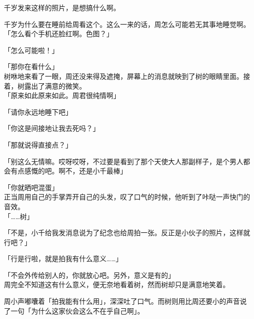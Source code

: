 千岁发来这样的照片，是想搞什么啊。

千岁为什么要在睡前给周看这个。这么一来的话，周怎么可能若无其事地睡觉啊。\\

「怎么看个手机还脸红啊。色图？」

「怎么可能啦！」

「那你在看什么」\\

树咻地来看了一眼，周还没来得及遮掩，屏幕上的消息就映到了树的眼睛里面。接着，树露出了满意的微笑。\\

「原来如此原来如此。周君很纯情啊」

「请你永远地睡下吧」

「你这是间接地让我去死吗？」

「那就说得直接点？」

「别这么无情嘛。哎呀哎呀，不过要是看到了那个天使大人那副样子，是个男人都会有点感慨的吧。啊不，还是小千最棒」

「你就晒吧混蛋」\\

正当周用自己的手掌弄开自己的头发，叹了口气的时候，他听到了咔哒一声快门的音效。\\

「……树」

「不是，小千给我发消息说为了纪念也给周拍一张。反正是小伙子的照片，这样就行吧？」

「行是行啦，就是拍我有什么意义……」

「不会外传给别人的，你就放心吧。另外，意义是有的」\\

周完全不知道这有什么意义，便无奈地看着树，然而树却只是满意地笑着。

周小声嘟囔着「拍我能有什么用」，深深吐了口气。而树则用比周还要小的声音说了一句「为什么这家伙会这么不在乎自己啊」。

